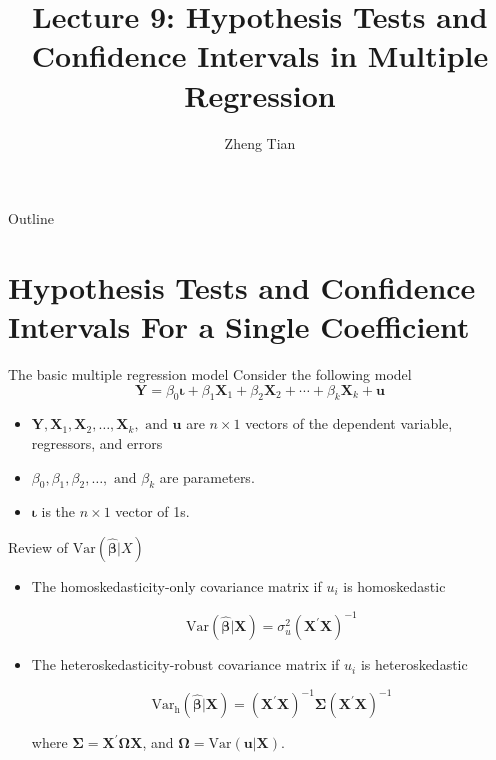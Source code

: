 \documentclass[presentation,10pt]{beamer}
\author{Zheng Tian}
\date{}
\title{Lecture 9: Hypothesis Tests and Confidence Intervals in Multiple Regression}
\newcommand{\var}{\mathrm{Var}}
\begin{document}
\maketitle
\begin{frame}{Outline}
\setcounter{tocdepth}{1}
\tableofcontents
\end{frame}



\section{Hypothesis Tests and Confidence Intervals For a Single Coefficient}
\label{sec:org280ef5a}
\setcounter{tocdepth}{1}
\tableofcontents[currentsection]
\begin{frame}[label={sec:org29ea1ed}]{The basic multiple regression model}
Consider the following model
\begin{equation}
\label{eq:jnt-hyp-mod}
\mathbf{Y} = \beta_0 \boldsymbol{\iota} + \beta_1 \mathbf{X}_1 + \beta_2 \mathbf{X}_2 + \cdots + \beta_k \mathbf{X}_k + \mathbf{u}
\end{equation}
\begin{itemize}
\item \(\mathbf{Y}, \mathbf{X}_1, \mathbf{X}_2, \ldots, \mathbf{X}_k, \text{ and } \mathbf{u}\) are \(n
  \times 1\) vectors of the dependent variable, regressors, and
errors
\item \(\beta_0, \beta_1, \beta_2, \ldots, \text{ and } \beta_k\) are
parameters.
\item \(\boldsymbol{\iota}\) is the \(n \times 1\) vector of 1s.
\end{itemize}
\end{frame}

\begin{frame}[label={sec:org3e0a1b4}]{Review of \(\var(\hat{\boldsymbol{\beta}}|X)\)}
\begin{itemize}
\item The homoskedasticity-only covariance matrix if \(u_i\) is
homoskedastic

\begin{equation}
\label{eq:varbhat-hm-1}
\var(\hat{\boldsymbol{\beta}} | \mathbf{X}) = \sigma^2_u (\mathbf{X}^{\prime} \mathbf{X})^{-1}
\end{equation}

\item The heteroskedasticity-robust covariance matrix if \(u_i\) is
heteroskedastic

\begin{equation}
\label{eq:varbhat-ht-1}
\var_{\mathrm{h}}(\hat{\boldsymbol{\beta}} | \mathbf{X}) = \left(\mathbf{X}^{\prime} \mathbf{X}\right)^{-1} \boldsymbol{\Sigma} (\mathbf{X}^{\prime} \mathbf{X})^{-1}
\end{equation}

where \(\boldsymbol{\Sigma} = \mathbf{X}^{\prime} \boldsymbol{\Omega}
  \mathbf{X}\), and \(\boldsymbol{\Omega} = \var(\mathbf{u} |
  \mathbf{X})\).
\end{itemize}
\end{frame}
\end{document}
